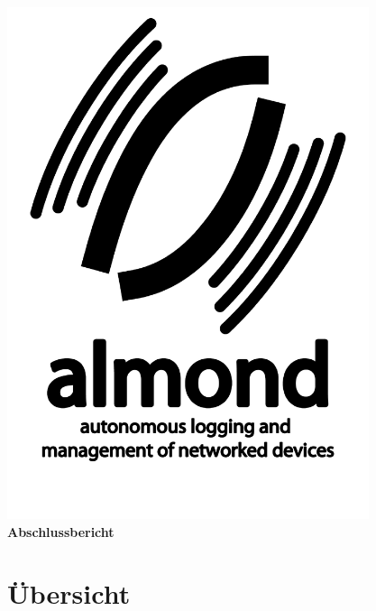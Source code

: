 \documentclass[12pt,a4paper]{article}
\begin{document}
\begin{titlepage}
	\begin{center}
		\includegraphics[height=15cm]{./logo.pdf}\\
		{\LARGE \bf Abschlussbericht}\\[0.3cm]
	\end{center}
\end{titlepage}

\tableofcontents

\newpage


\section{Übersicht}
\end{document}
